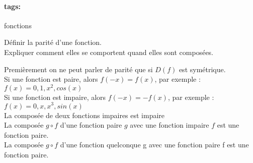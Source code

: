 \documentclass[12pt]{article}
\newcommand*{\xfield}[1]{\begin{mdframed}\centering #1\end{mdframed}\bigskip}
\newenvironment{note}{}{}
\newcommand*{\tags}[1]{\paragraph{tags: }#1}
\begin{document}
\begin{note}
	\tags{fonctions}
    \xfield{
        Définir la parité d'une fonction.\\
        Expliquer comment elles se comportent quand elles sont composées.
    }
    \xfield{
        Premièrement on ne peut parler de parité que si $D(f)$ est symétrique.\\
        Si une fonction est paire, alors $f(-x) = f(x)$, par exemple : $f(x) = 0,1 , x^2, cos(x)$\\
        Si une fonction est impaire, alors $f(-x) = -f(x)$, par exemple : $f(x) = 0,x,x^3,sin(x)$\\
        La composée de deux fonctions impaires est impaire\\
        La composée $g \circ f$ d'une fonction paire $g$ avec une fonction impaire $f$ est une fonction paire.\\
        La composée $g \circ f$ d'une fonction quelconque g avec une fonction paire f est une fonction paire.}
\end{note}
\end{document}
